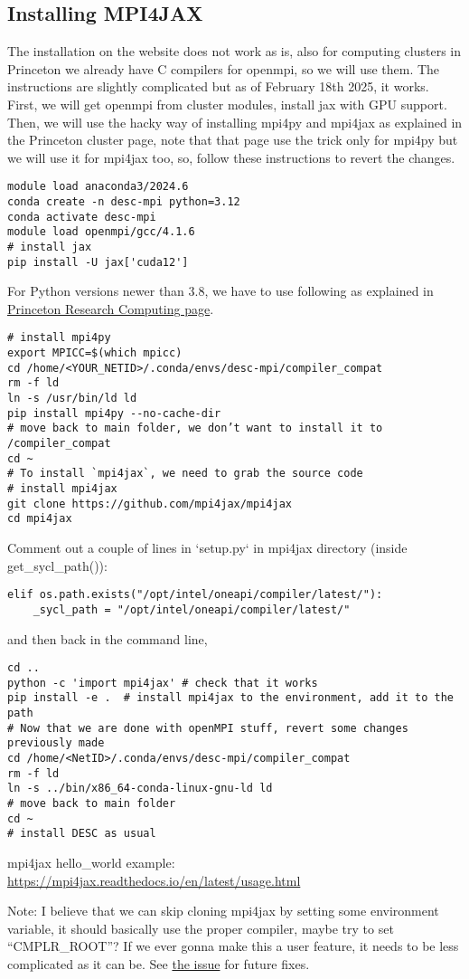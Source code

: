 \subsection{Installing MPI4JAX}
The installation on the website does not work as is, also for computing clusters in Princeton we already have C compilers for openmpi, so we will use them. The instructions are slightly complicated but as of February 18th 2025, it works. First, we will get openmpi from cluster modules, install jax with GPU support. Then, we will use the hacky way of installing mpi4py and mpi4jax as explained in the Princeton cluster page, note that that page use the trick only for mpi4py but we will use it for mpi4jax too, so, follow these instructions to revert the changes.

\begin{verbatim}
module load anaconda3/2024.6
conda create -n desc-mpi python=3.12
conda activate desc-mpi
module load openmpi/gcc/4.1.6
# install jax
pip install -U jax['cuda12']
\end{verbatim}

For Python versions newer than 3.8, we have to use following as explained in \href{https://researchcomputing.princeton.edu/support/knowledge-base/mpi4py}{Princeton Research Computing page}.
\begin{verbatim}
# install mpi4py
export MPICC=$(which mpicc)
cd /home/<YOUR_NETID>/.conda/envs/desc-mpi/compiler_compat
rm -f ld
ln -s /usr/bin/ld ld
pip install mpi4py --no-cache-dir
# move back to main folder, we don’t want to install it to /compiler_compat
cd ~
# To install `mpi4jax`, we need to grab the source code
# install mpi4jax
git clone https://github.com/mpi4jax/mpi4jax
cd mpi4jax
\end{verbatim}

Comment out a couple of lines in `setup.py` in mpi4jax directory (inside get\_sycl\_path()):
\begin{verbatim}
elif os.path.exists("/opt/intel/oneapi/compiler/latest/"):
	_sycl_path = "/opt/intel/oneapi/compiler/latest/"
\end{verbatim}

and then back in the command line,
\begin{verbatim}
cd ..
python -c 'import mpi4jax' # check that it works
pip install -e .  # install mpi4jax to the environment, add it to the path
# Now that we are done with openMPI stuff, revert some changes previously made
cd /home/<NetID>/.conda/envs/desc-mpi/compiler_compat
rm -f ld
ln -s ../bin/x86_64-conda-linux-gnu-ld ld
# move back to main folder
cd ~
# install DESC as usual
\end{verbatim}

mpi4jax hello\_world example: \url{https://mpi4jax.readthedocs.io/en/latest/usage.html}

Note: I believe that we can skip cloning mpi4jax by setting some environment variable, it should basically use the proper compiler, maybe try to set “CMPLR\_ROOT”?
If we ever gonna make this a user feature, it needs to be less complicated as it can be. See \href{https://github.com/mpi4jax/mpi4jax/issues/245}{the issue} for future fixes.
